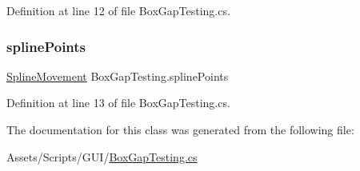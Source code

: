 Definition at line 12 of file Box\+Gap\+Testing.\+cs.

\mbox{\label{class_box_gap_testing_a7d1c8565eb1f3236338e9a58a4bcc0b8}} 
\subsubsection{\texorpdfstring{spline\+Points}{splinePoints}}
{\footnotesize\ttfamily \mbox{\hyperlink{class_spline_movement}{Spline\+Movement}} Box\+Gap\+Testing.\+spline\+Points}



Definition at line 13 of file Box\+Gap\+Testing.\+cs.



The documentation for this class was generated from the following file\+:\begin{DoxyCompactItemize}
\item 
Assets/\+Scripts/\+G\+U\+I/\mbox{\hyperlink{_box_gap_testing_8cs}{Box\+Gap\+Testing.\+cs}}\end{DoxyCompactItemize}
